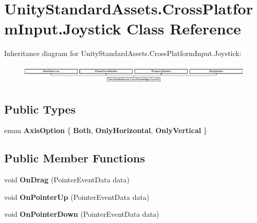 \hypertarget{class_unity_standard_assets_1_1_cross_platform_input_1_1_joystick}{}\section{Unity\+Standard\+Assets.\+Cross\+Platform\+Input.\+Joystick Class Reference}
\label{class_unity_standard_assets_1_1_cross_platform_input_1_1_joystick}
Inheritance diagram for Unity\+Standard\+Assets.\+Cross\+Platform\+Input.\+Joystick\+:\begin{figure}[H]
\begin{center}
\leavevmode
\includegraphics[height=0.945946cm]{class_unity_standard_assets_1_1_cross_platform_input_1_1_joystick}
\end{center}
\end{figure}
\subsection*{Public Types}
\begin{DoxyCompactItemize}
\item 
\mbox{\label{class_unity_standard_assets_1_1_cross_platform_input_1_1_joystick_a6d8c31bfbf3b5fb568caa04cfd87f901}} 
enum {\bfseries Axis\+Option} \{ {\bfseries Both}, 
{\bfseries Only\+Horizontal}, 
{\bfseries Only\+Vertical}
 \}
\end{DoxyCompactItemize}
\subsection*{Public Member Functions}
\begin{DoxyCompactItemize}
\item 
\mbox{\label{class_unity_standard_assets_1_1_cross_platform_input_1_1_joystick_a156c19bc0a3fe7a4c3b954e8c2c4a90e}} 
void {\bfseries On\+Drag} (Pointer\+Event\+Data data)
\item 
\mbox{\label{class_unity_standard_assets_1_1_cross_platform_input_1_1_joystick_ab7f7dbe18f7b229df10dd925534b4fbf}} 
void {\bfseries On\+Pointer\+Up} (Pointer\+Event\+Data data)
\item 
\mbox{\label{class_unity_standard_assets_1_1_cross_platform_input_1_1_joystick_a8df75692befe2a2426f6eee7a7e5765c}} 
void {\bfseries On\+Pointer\+Down} (Pointer\+Event\+Data data)
\end{DoxyCompactItemize}
